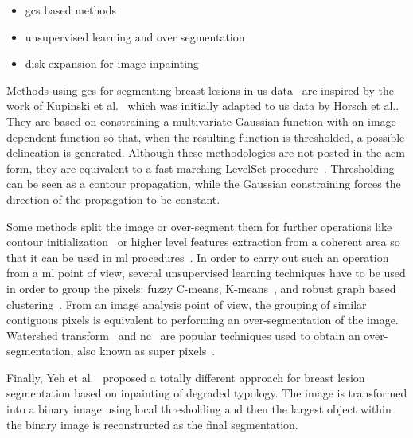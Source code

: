 \documentclass[authoryear,preprint,review,12pt]{elsarticle}
\begin{document}
\begin{itemize}
\item{\acf{gcs} based methods}
\item{unsupervised learning and over segmentation}
\item{disk expansion for image inpainting}
\end{itemize}

Methods using \ac{gcs} for segmenting breast lesions in \ac{us} data~\cite{Horsch:2001p6028,massich2010lesion,Drukker:2002p10442,Gomez:2010p14339}
 are inspired by the work of Kupinski et al.~\cite{Kupinski:1998p9024} which was initially adapted to \ac{us} data by Horsch et al.\cite{Horsch:2002p6049}. They are based on constraining a multivariate Gaussian function with an image dependent function so that, when the resulting function is thresholded, a possible delineation is generated. Although these methodologies are not posted in the \ac{acm} form, they are equivalent to a fast marching LevelSet procedure~\cite{sethian1996fast}. Thresholding can be seen as a contour propagation, while the Gaussian constraining forces the direction of the propagation to be constant. 

Some methods split the image or over-segment them for further operations like contour initialization~\cite{Huang:2005p11636,Huang:2012p14313} or higher level features extraction from a coherent area so that it can be used in \ac{ml} procedures~\cite{hao2012combining,chiang2010cell}. In order to carry out such an operation from a \ac{ml} point of view, several unsupervised learning techniques have to be used in order to group the pixels: fuzzy C-means, K-means~\cite{Cui:2009p14325}, and robust graph based clustering~\cite{Huang:2012p14313}. 
From an image analysis point of view, the grouping of similar contiguous pixels is equivalent to performing an over-segmentation of the image. Watershed transform~\cite{Huang:2005p11636,chiang2010cell,Huang:2004p2092} and \ac{nc}~\cite{shi2000normalized,hao2012combining,Liu:2005p14341} are popular techniques used to obtain an over-segmentation, also known as super pixels~\cite{achanta2012slic}. 

Finally, Yeh et al.~\cite{Yeh:2009p11985} proposed a totally different approach for breast lesion segmentation based on inpainting of degraded typology. The image is transformed into a binary image using local thresholding and then the largest object within the binary image is reconstructed as the final segmentation.
\end{document}

